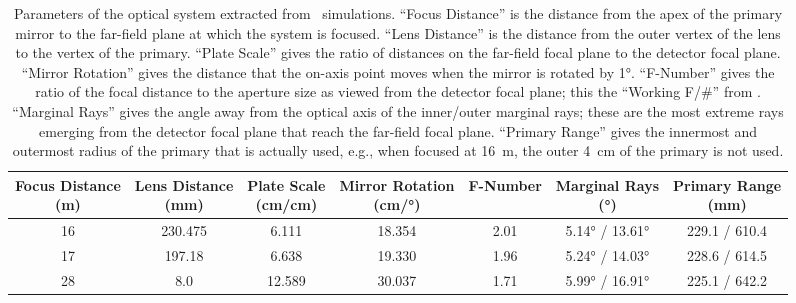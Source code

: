 \begin{table}
\centering
\caption[Parameters of the optical system extracted from \ZEMAX\ simulations]{
  Parameters of the optical system extracted from \ZEMAX\ simulations.
  ``Focus Distance'' is the distance from the apex of the primary mirror to the far-field plane at which the system is focused.
  ``Lens Distance'' is the distance from the outer vertex of the lens to the vertex of the primary.
  ``Plate Scale'' gives the ratio of distances on the far-field focal plane to the detector focal plane.
  ``Mirror Rotation'' gives the distance that the on-axis point moves when the mirror is rotated by \ang{1}.
  ``F-Number'' gives the ratio of the focal distance to the aperture size as viewed from the detector focal plane; this the ``Working F/\#'' from \ZEMAX.
  ``Marginal Rays'' gives the angle away from the optical axis of the inner/outer marginal rays; these are the most extreme rays emerging from the detector focal plane that reach the far-field focal plane.
  ``Primary Range'' gives the innermost and outermost radius of the primary that is actually used, e.g., when focused at \SI{16}{\m}, the outer \SI{4}{\cm} of the primary is not used.
}
\label{tab:ch4-zemax-parms}
\begin{tabular}{ccccccc}
\toprule
  \specialcell{Focus Distance \\ (\si{\m})} &
  \specialcell{Lens Distance \\ (\si{\mm})} &
  \specialcell{Plate Scale \\ (\si{\cm}/\si{\cm})} &
  \specialcell{Mirror Rotation \\ (\si{\cm}/\si{\degree})} &
  \specialcell{F-Number  \\ } & 
  \specialcell{Marginal Rays \\ (\si{\degree})} &
  \specialcell{Primary Range \\ (\si{\mm})} \\
\midrule
16 & 230.475 &  6.111 & 18.354 & 2.01 &  \ang{5.14} / \ang{13.61} & 229.1 / 610.4 \\
17 & 197.18  &  6.638 & 19.330 & 1.96 &  \ang{5.24} / \ang{14.03} & 228.6 / 614.5 \\ 
28 &   8.0   & 12.589 & 30.037 & 1.71 &  \ang{5.99} / \ang{16.91} & 225.1 / 642.2 \\
\bottomrule
\end{tabular}
\end{table}

